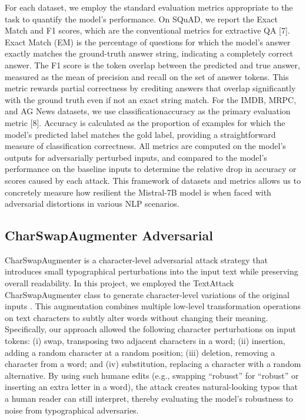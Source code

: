 \documentclass[conference]{IEEEtran}
\begin{document}
For each dataset, we employ the standard evaluation metrics appropriate to the task to quantify the model’s performance. On SQuAD, we report the Exact Match and F1 scores, which are the conventional metrics for extractive QA [7]. Exact Match (EM) is the percentage of questions for which the model’s answer exactly matches the ground-truth answer string, indicating a completely correct answer. The F1 score is the token overlap between the predicted and true answer, measured as the mean of precision and recall on the set of answer tokens. This metric rewards partial correctness by crediting answers that overlap significantly with the ground truth even if not an exact string match. For the IMDB, MRPC, and AG News datasets, we use classificationaccuracy as the primary evaluation metric [8]. Accuracy is calculated as the proportion of examples for which the model’s predicted label matches the gold label, providing a straightforward measure of classification correctness. All metrics are computed on the model’s outputs for adversarially perturbed inputs, and compared to the model’s performance on the baseline inputs to determine the relative drop in accuracy or scores caused by each attack. This framework of datasets and metrics allows us to concretely measure how resilient the Mistral-7B model is when faced with adversarial distortions in various NLP scenarios.

\subsection{CharSwapAugmenter Adversarial}

CharSwapAugmenter is a character-level adversarial attack strategy that introduces small typographical perturbations into the input text while preserving overall readability. In this project, we employed the TextAttack CharSwapAugmenter class to generate character-level variations of the original inputs \cite{textattack2020framework}. This augmentation combines multiple low-level transformation operations on text characters to subtly alter words without changing their meaning. Specifically, our approach allowed the following character perturbations on input tokens: (i) swap, transposing two adjacent characters in a word; (ii) insertion, adding a random character at a random position; (iii) deletion, removing a character from a word; and (iv) substitution, replacing a character with a random alternative. By using such humane edits (e.g., swapping “robusst” for “robust” or inserting an extra letter in a word), the attack creates natural-looking typos that a human reader can still interpret, thereby evaluating the model’s robustness to noise from typographical adversaries.
\end{document}
